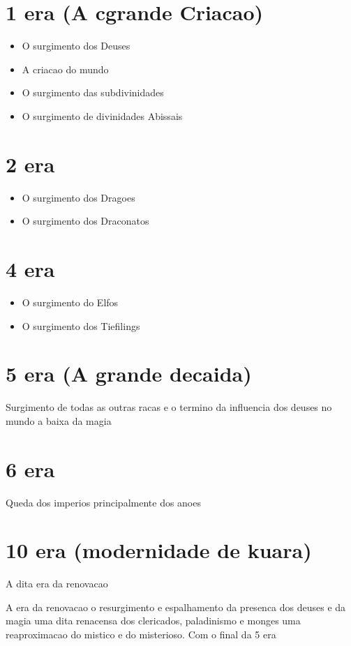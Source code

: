 \documentclass{book}
\begin{document}
\section{1 era (A cgrande Criacao)}
\begin{itemize}
    \item O surgimento dos Deuses
    \item A criacao do mundo 
    \item O surgimento das subdivinidades
    \item O surgimento de divinidades Abissais 
\end{itemize}

\section{2 era}
\begin{itemize}
    \item O surgimento dos Dragoes 
    \item O surgimento dos Draconatos
\end{itemize}

\section{4 era}
\begin{itemize}
    \item O surgimento do Elfos 
    \item O surgimento dos Tiefilings
\end{itemize}

\section{5 era (A grande decaida)}
Surgimento de todas as outras racas
e o termino da influencia dos deuses no mundo a baixa da magia
\section{6 era}
Queda dos imperios principalmente dos anoes
\section{10 era (modernidade de kuara)}
A dita era da renovacao 

A era da renovacao o resurgimento e espalhamento da presenca dos deuses e da magia uma dita 
renacensa dos clericados, paladinismo e monges uma reaproximacao do mistico e do misterioso.
Com o final da 5 era 
\end{document}
